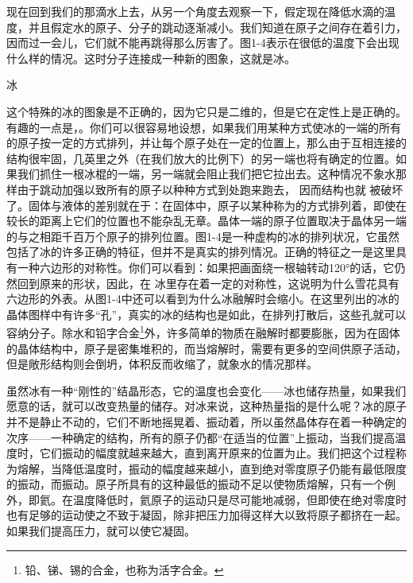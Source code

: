 \documentclass[12pt,oneside]{book}
\begin{document}
\begin{common-format}
现在回到我们的那滴水上去，从另一个角度去观察一下，假定现在降低水滴的温度，并且假定水的原子、分子的跳动逐渐减小。我们知道在原子之间存在着引力，因而过一会儿，它们就不能再跳得那么厉害了。图1-4表示在很低的温度下会出现什么样的情况。这时分子连接成一种新的图象，这就是冰。
\begin{fig}{冰}
\caption{冰}
\label{fig:冰}
\end{fig}
这个特殊的冰的图象是不正确的，因为它只是二维的，但是它在定性上是正确的。有趣的一点是，。你们可以很容易地设想，如果我们用某种方式使冰的一端的所有的原子按一定的方式排列，并让每个原子处在一定的位置上，那么由于互相连接的结构很牢固，几英里之外（在我们放大的比例下）的另一端也将有确定的位置。如果我们抓住一根冰棍的一端，另一端就会阻止我们把它拉出去。这种情况不象水那样由于跳动加强以致所有的原子以种种方式到处跑来跑去， 因而结构也就
被破坏了。固体与液体的差别就在于：在固体中，原子以某种称为的方式排列着，即使在较长的距离上它们的位置也不能杂乱无章。晶体一端的原子位置取决于晶体另一端的与之相距千百万个原子的排列位置。图1-4是一种虚构的冰的排列状况，它虽然包括了冰的许多正确的特征，但并不是真实的排列情况。正确的特征之一是这里具有一种六边形的对称性。你们可以看到：如果把画面绕一根轴转动120°的话，它仍然回到原来的形状，因此，在
冰里存在着一定的对称性，这说明为什么雪花具有六边形的外表。从图1-4中还可以看到为什么冰融解时会缩小。在这里列出的冰的晶体图样中有许多“孔”，真实的冰的结构也是如此，在排列打散后，这些孔就可以容纳分子。除水和铅字合金\footnote{铅、锑、锡的合金，也称为活字合金。}外，许多简单的物质在融解时都要膨胀，因为在固体的晶体结构中，原子是密集堆积的，而当熔解时，需要有更多的空间供原子活动，但是敞形结构则会倒坍，体积反而收缩了，就象水的情况那样。

虽然冰有一种“刚性的”结晶形态，它的温度也会变化——冰也储存热量，如果我们愿意的话，就可以改变热量的储存。对冰来说，这种热量指的是什么呢？冰的原子并不是静止不动的，它们不断地摇晃着、振动着，所以虽然晶体存在着一种确定的次序——一种确定的结构，所有的原子仍都“在适当的位置”上振动，当我们提高温度时，它们振动的幅度就越来越大，直到离开原来的位置为止。我们把这个过程称为熔解，当降低温度时，振动的幅度越来越小，直到绝对零度原子仍能有最低限度的振动，而振动。原子所具有的这种最低的振动不足以使物质熔解，只有一个例外，即氦。在温度降低时，氦原子的运动只是尽可能地减弱，但即使在绝对零度时也有足够的运动使之不致于凝固，除非把压力加得这样大以致将原子都挤在一起。如果我们提高压力，就可以使它凝固。



\end{common-format}
\end{document}
